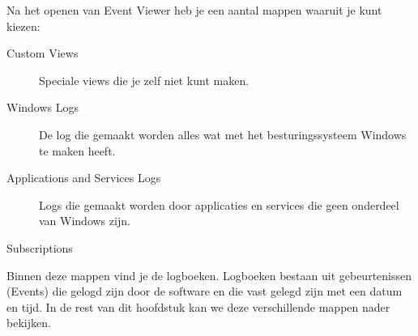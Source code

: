 Na het openen van Event Viewer heb je een aantal mappen waaruit je kunt kiezen:
\begin{description}
\item[Custom Views] Speciale views die je zelf niet kunt maken.
\item[Windows Logs] De log die gemaakt worden alles wat met het besturingssysteem Windows te maken heeft.
\item[Applications and Services Logs] Logs die gemaakt worden door applicaties en services die geen onderdeel van Windows zijn.
\item[Subscriptions] 
\end{description}
Binnen deze mappen vind je de logboeken. Logboeken bestaan uit gebeurtenissen (Events) die gelogd zijn door de software en die vast gelegd zijn met een datum en tijd. In de rest van dit hoofdstuk kan we deze verschillende mappen nader bekijken.

